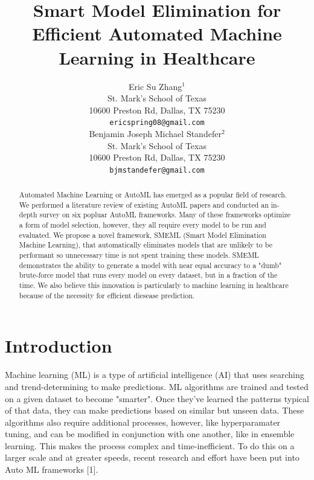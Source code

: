 \documentclass{article}
\title{Smart Model Elimination for Efficient Automated Machine Learning in Healthcare}
\author{%
  Eric Su Zhang$^1$ \\
  St. Mark's School of Texas\\
  10600 Preston Rd, Dallas, TX 75230\\
  \texttt{ericspring08@gmail.com} \\
  \And
  Benjamin Joseph Michael Standefer$^2$ \\
  St. Mark's School of Texas \\
  10600 Preston Rd, Dallas, TX 75230 \\
  \texttt{bjmstandefer@gmail.com} \\
}
\begin{document}
\maketitle


\begin{abstract}
  Automated Machine Learning or AutoML has emerged as a popular field of research. We performed a literature review of existing AutoML papers and conducted an in-depth survey on six popluar AutoML frameworks. Many of these frameworks optimize a form of model selection, however, they all require every model to be run and evaluated. We propose a novel framework, SMEML (Smart Model Elimination Machine Learning), that automatically eliminates models that are unlikely to be performant so unnecessary time is not spent training these models. SMEML demonstrates the ability to generate a model with near equal accuracy to a "dumb" brute-force model that runs every model on every dataset, but in a fraction of the time. We also believe this innovation is particularly to machine learning in healthcare because of the necessity for efficient diesease prediction. 
\end{abstract}


\section{Introduction}

Machine learning (ML) is a type of artificial intelligence (AI) that uses searching and trend-determining to make predictions. ML algorithms are trained and tested on a given dataset to become "smarter". Once they've learned the patterns typical of that data, they can make predictions based on similar but unseen data. These algorithms also require additional processes, however, like hyperparamater tuning, and can be modified in conjunction with one another, like in ensemble learning. This makes the process complex and time-inefficient. To do this on a larger scale and at greater speeds, recent research and effort have been put into Auto ML frameworks [1].
\end{document}
